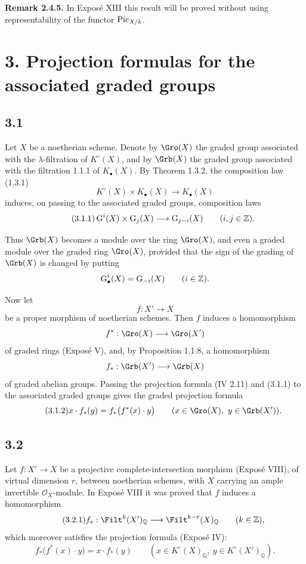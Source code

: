 \textbf{Remark 2.4.5.}
In Expos\'e XIII this result will be proved without using representability of
the functor $\operatorname{Pic}_{X/k}$.

\section*{3. Projection formulas for the associated graded groups}

\subsection*{3.1}
Let $X$ be a noetherian scheme. Denote by $\Gro(X)$ the graded group associated
with the \mbox{$\lambda$-filtration} of $K^\circ(X)$, and by $\Grb(X)$ the graded
group associated with the filtration 1.1.1 of $K_\bullet(X)$. By Theorem
1.3.2, the composition law (1.3.1)
\[
K^\circ(X)\times K_\bullet(X)\longrightarrow K_\bullet(X)
\]
induces, on passing to the associated graded groups, composition laws
\begin{equation}\tag{3.1.1}
\operatorname{G}^i(X)\times\operatorname{G}_j(X)\longrightarrow\operatorname{G}_{j-i}(X)
\qquad(i,j\in\mathbb Z).
\end{equation}

Thus $\Grb(X)$ becomes a module over the ring $\Gro(X)$, and even a graded
module over the graded ring $\Gro(X)$, provided that the sign of the grading
of $\Grb(X)$ is changed by putting
\[
\operatorname{G}^i_\bullet(X)=\operatorname{G}_{-i}(X)\qquad(i\in\mathbb Z).
\]

Now let
\[
f:X'\longrightarrow X
\]
be a proper morphism of noetherian schemes. Then $f$ induces a homomorphism
\[
f^*:\Gro(X)\longrightarrow\Gro(X')
\]
of graded rings (Expos\'e V), and, by Proposition 1.1.8, a homomorphism
\[
f_*:\Grb(X')\longrightarrow\Grb(X)
\]
of graded abelian groups. Passing the projection formula (IV 2.11) and
(3.1.1) to the associated graded groups gives the graded projection formula
\begin{equation}\tag{3.1.2}
x\cdot f_*(y)=f_*\bigl(f^*(x)\cdot y\bigr)
\qquad(x\in\Gro(X),\ y\in\Grb(X')).
\end{equation}

\subsection*{3.2}
Let $f:X'\to X$ be a projective complete-intersection morphism (Expos\'e
VIII), of virtual dimension $r$, between noetherian schemes, with $X$ carrying
an ample invertible $\mathcal O_X$-module. In Expos\'e VIII it was proved that
$f$ induces a homomorphism
\begin{equation}\tag{3.2.1}
f_*:\Filt^k(X')_{\mathbb Q}\longrightarrow
\Filt^{k-r}(X)_{\mathbb Q}\qquad(k\in\mathbb Z),
\end{equation}
which moreover satisfies the projection formula (Expos\'e IV):
\begin{equation}\tag{3.2.2}
f_*\bigl(f^*(x)\cdot y\bigr)=x\cdot f_*(y)
\qquad(x\in K^\circ(X)_{\mathbb Q},\ y\in K^\circ(X')_{\mathbb Q}).
\end{equation}

